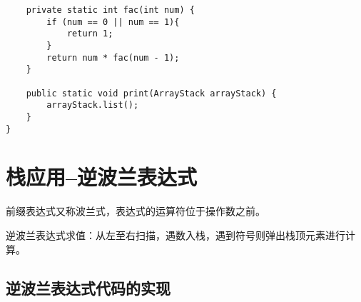 \documentclass[a4paper]{report}
\begin{document}
\begin{lstlisting}
    private static int fac(int num) {
        if (num == 0 || num == 1){
            return 1;
        }
        return num * fac(num - 1);
    }

    public static void print(ArrayStack arrayStack) {
        arrayStack.list();
    }
}
\end{lstlisting}
\section{栈应用--逆波兰表达式}

前缀表达式又称波兰式，表达式的运算符位于操作数之前。

逆波兰表达式求值：从左至右扫描，遇数入栈，遇到符号则弹出栈顶元素进行计算。

\subsection{逆波兰表达式代码的实现}
\end{document}
